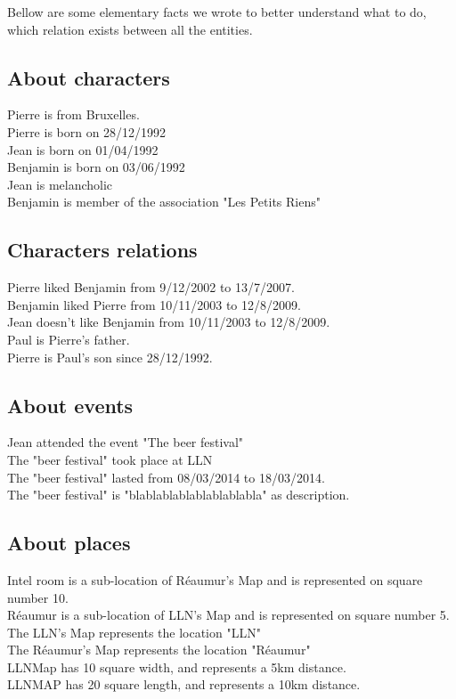 \documentclass[a4paper ,12pt,french]{article}
\begin{document}
Bellow are some elementary facts we wrote to better understand what to do, which relation exists between all the entities.

\subsection{About characters}

\noindent Pierre is from Bruxelles.\\
Pierre is born on 28/12/1992\\
Jean is born on 01/04/1992\\
Benjamin is born on 03/06/1992\\
Jean is melancholic\\
Benjamin is member of the association "Les Petits Riens"

\subsection{Characters relations}
\noindent Pierre liked Benjamin from 9/12/2002 to 13/7/2007.\\
Benjamin liked Pierre from 10/11/2003 to 12/8/2009.\\
Jean doesn't like Benjamin from 10/11/2003 to 12/8/2009.\\
Paul is Pierre's father.\\
Pierre is Paul's son since 28/12/1992.\\


\subsection{About events}

\noindent Jean attended the event "The beer festival"\\
The "beer festival" took place at LLN\\
The "beer festival" lasted from 08/03/2014 to 18/03/2014.\\
The "beer festival" is "blablablablablablablabla" as description.


\subsection{About places}
\noindent Intel room is a sub-location of Réaumur's Map and is represented on square number 10.\\
Réaumur is a sub-location of  LLN's Map and is represented on square number  5.\\
The LLN's Map represents the location "LLN"\\
The Réaumur's Map represents the location "Réaumur"\\
LLNMap has 10 square width, and represents a 5km distance.\\
LLNMAP has 20 square length, and represents a 10km distance.
\end{document}
